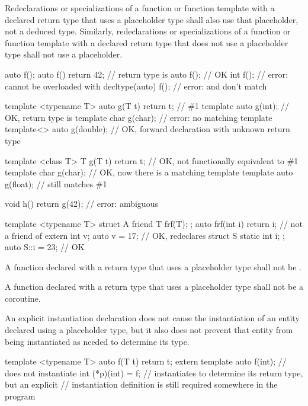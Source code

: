 \pnum
Redeclarations or specializations of a function or function template with a
declared return type that uses a placeholder type shall also use that
placeholder, not a deduced type.
Similarly,
redeclarations or specializations of a function or function template with a
declared return type that does not use a placeholder type
shall not use a placeholder.
\begin{example}
\begin{codeblock}
auto f();
auto f() { return 42; }                         // return type is 
auto f();                                       // OK
int f();                                        // error: cannot be overloaded with 
decltype(auto) f();                             // error:  and  don't match

template <typename T> auto g(T t) { return t; } // \#1
template auto g(int);                           // OK, return type is 
template char g(char);                          // error: no matching template
template<> auto g(double);                      // OK, forward declaration with unknown return type

template <class T> T g(T t) { return t; }       // OK, not functionally equivalent to \#1
template char g(char);                          // OK, now there is a matching template
template auto g(float);                         // still matches \#1

void h() { return g(42); }                      // error: ambiguous

template <typename T> struct A {
  friend T frf(T);
};
auto frf(int i) { return i; }                   // not a friend of 
extern int v;
auto v = 17;                                    // OK, redeclares 
struct S {
  static int i;
};
auto S::i = 23;                                 // OK
\end{codeblock}
\end{example}

\pnum
A function declared with a return type that uses a placeholder type shall not
be .

\pnum
A function declared with a return type that uses a placeholder type shall not
be a coroutine.

\pnum
An explicit instantiation declaration does not cause the
instantiation of an entity declared using a placeholder type, but it also does
not prevent that entity from being instantiated as needed to determine its
type.
\begin{example}
\begin{codeblock}
template <typename T> auto f(T t) { return t; }
extern template auto f(int);    // does not instantiate 
int (*p)(int) = f;              // instantiates  to determine its return type, but an explicit
                                // instantiation definition is still required somewhere in the program
\end{codeblock}
\end{example}

